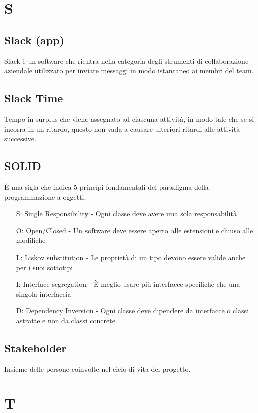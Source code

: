 	\section{S}
	\subsection{Slack (app)} 
	Slack è un software che rientra nella categoria degli strumenti di collaborazione aziendale utilizzato per inviare messaggi in modo istantaneo ai membri del team.
	
	\subsection{Slack Time}
	Tempo in surplus che viene assegnato ad ciascuna attività, in modo tale che se si incorra in un ritardo, questo non vada a causare ulteriori ritardi alle attività successive.
	
	\subsection{SOLID}
	\`E una sigla che indica 5 princ\'{i}pi fondamentali del paradigma della programmazione a oggetti.
	\begin{itemize}
		\item[S:] Single Responsibility - Ogni classe deve avere una sola responsabilità
		\item[O:] Open/Closed - Un software deve essere aperto alle estensioni e chiuso alle modifiche
		\item[L:] Liskov substitution - Le proprietà di un tipo devono essere valide anche per i suoi sottotipi
		\item[I:] Interface segregation - \`E meglio usare più interfacce specifiche che una singola interfaccia
		\item[D:] Dependency Inversion - Ogni classe deve dipendere da interfacce o classi astratte e non da classi concrete
	\end{itemize}	 
	
	\subsection{Stakeholder}
	Insieme delle persone coinvolte nel ciclo di vita del progetto.
	
	\section{T}
